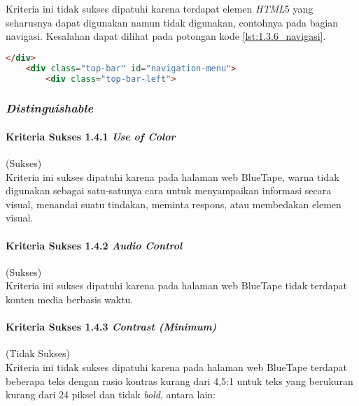 Kriteria ini tidak sukses dipatuhi karena terdapat elemen \textit{HTML}5 yang seharusnya dapat digunakan namun tidak digunakan, contohnya pada bagian navigasi. Kesalahan dapat dilihat pada potongan kode \ref{lst:1.3.6_navigasi}.

\begin{lstlisting}[frame=single, label={lst:1.3.6_navigasi}, language=HTML, caption=Kriteria Sukses 1.3.6 - Navigasi]
    </div>
    <div class="top-bar" id="navigation-menu">
        <div class="top-bar-left">
\end{lstlisting}

\subsubsection{\textit{Distinguishable}}
\label{subsubsec:kepatuhan_bluetape_distinguishable}

\paragraph{Kriteria Sukses 1.4.1 \textit{Use of Color}}
\label{par:kepatuhan_bluetape_kriteria_sukses_1.4.1}
(Sukses)\\

Kriteria ini sukses dipatuhi karena pada halaman web BlueTape, warna tidak digunakan sebagai satu-satunya cara untuk menyampaikan informasi secara visual, menandai suatu tindakan, meminta respons, atau membedakan elemen visual.

\paragraph{Kriteria Sukses 1.4.2 \textit{Audio Control}}
\label{par:kepatuhan_bluetape_kriteria_sukses_1.4.2}
(Sukses)\\

Kriteria ini sukses dipatuhi karena pada halaman web BlueTape tidak terdapat konten media berbasis waktu.

\paragraph{Kriteria Sukses 1.4.3 \textit{Contrast (Minimum)}}
\label{par:kepatuhan_bluetape_kriteria_sukses_1.4.3}
(Tidak Sukses)\\

Kriteria ini tidak sukses dipatuhi karena pada halaman web BlueTape terdapat beberapa teks dengan rasio kontras kurang dari 4,5:1 untuk teks yang berukuran kurang dari 24 piksel dan tidak \textit{bold}, antara lain:

